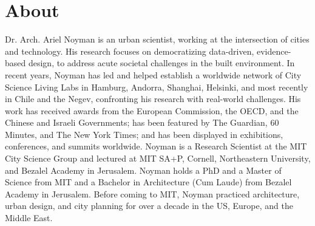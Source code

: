 \section*{About}

 {
Dr. Arch. Ariel Noyman is an urban scientist, working at the intersection of cities and technology. His research focuses on democratizing data-driven, evidence-based design, to address acute societal challenges in the built environment. In recent years, Noyman has led and helped establish a worldwide network of City Science Living Labs in Hamburg, Andorra, Shanghai, Helsinki, and most recently in Chile and the Negev, confronting his research with real-world challenges. His work has received awards from the European Commission, the OECD, and the Chinese and Israeli Governments; has been featured by The Guardian, 60 Minutes, and The New York Times; and has been displayed in exhibitions, conferences, and summits worldwide. Noyman is a Research Scientist at the MIT City Science Group and lectured at MIT SA+P, Cornell, Northeastern University, and Bezalel Academy in Jerusalem. Noyman holds a PhD and a Master of Science from MIT and a Bachelor in Architecture (Cum Laude) from Bezalel Academy in Jerusalem. Before coming to MIT, Noyman practiced architecture, urban design, and city planning for over a decade in the US, Europe, and the Middle East.
 }

